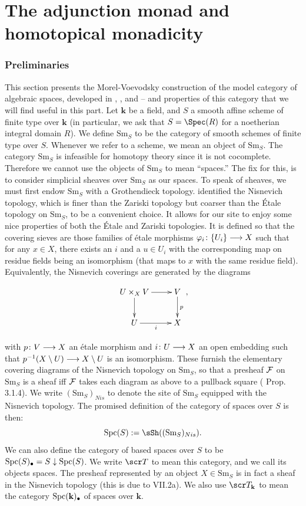 \documentclass{amsart}
\theoremstyle{definition}
\newcommand{\bk}{\mathbf{k}}
\begin{document}
\part{The adjunction monad and homotopical monadicity}\label{part:1}
\section{Preliminaries}\label{sec:prelim}
This section presents the Morel-Voevodsky construction of the model category of algebraic spaces, developed in  \cite{voev96pre}, \cite{MV99}, and \cite{morel12A1AT} -- and properties of this category that we will find useful in this part. Let $\bk$ be a field, and $S$ a smooth affine scheme of finite type over $\bk$ (in particular, we ask that $S = \Spec(R)$ for a noetherian integral domain $R$). We define $\mathrm{Sm}_S$ to be the category of smooth schemes of finite type over $S$. Whenever we refer to a scheme, we mean an object of $\mathrm{Sm}_S$. The category $\mathrm{Sm}_S$ is infeasible for homotopy theory since it is not cocomplete. Therefore we cannot use the objects of $\mathrm{Sm}_S$ to mean ``spaces.'' The fix for this, is to consider simplicial sheaves over $\mathrm{Sm}_S$ as our spaces. To speak of sheaves, we must first endow $\mathrm{Sm}_S$ with a Grothendieck topology. \cite{MV99} identified the Nisnevich topology, which is finer than the Zariski topology but coarser than the \'Etale topology on $\mathrm{Sm}_S$, to be a convenient choice. It allows for our site to enjoy some nice properties of both the \'Etale and Zariski topologies. It is defined so that the covering sieves are those families of \'etale morphisms $\varphi_i \colon \{U_i\} \longrightarrow X$ such that for any $x \in X$, there exists an $i$ and a $u \in U_i$ with the corresponding map on residue fields being an isomorphism (that maps to $x$ with the same residue field). Equivalently, the Nisnevich coverings are generated by the diagrams

\[\xymatrix{U \times_X V \ar[d] \ar[r] & V \ar[d]^{p} \\ U \ar[r]_{i} & X},\]

\noindent with $p \colon V \longrightarrow X$ an \'etale morphism and $i \colon U \longrightarrow X$ an open embedding such that $p^{-1}(X \setminus U) \longrightarrow X \setminus U$ is an isomorphism. These furnish the elementary covering diagrams of the Nisnevich topology on $\mathrm{Sm}_S$, so that a presheaf ${\mathcal{F}}$ on $\mathrm{Sm}_S$ is a sheaf iff ${\mathcal{F}}$ takes each diagram as above to a pullback square (\cite{MV99} Prop. 3.1.4). We write $(\mathrm{Sm}_S)_{Nis}$ to denote the site of $\mathrm{Sm}_S$ equipped with the Nisnevich topology. The promised definition of the category of spaces over $S$ is then: \[\mathrm{Spc}(S) := \sSh((\mathrm{Sm}_S)_{Nis}).\]
\noindent We can also define the category of based spaces over $S$ to be $\mathrm{Spc}(S)_{\bullet} = S \downarrow \mathrm{Spc}(S)$. We write $\sT$ to mean this category, and we call its objects spaces. The presheaf represented by an object $X \in \mathrm{Sm}_S$ is in fact a sheaf in the Nisnevich topology (this is due to \cite{SGA4V2} VII.2a). We also use $\sT_{\bk}$ to mean the category $\mathrm{Spc}(\bk)_{\bu}$ of spaces over $\bk$.\\
\end{document}
